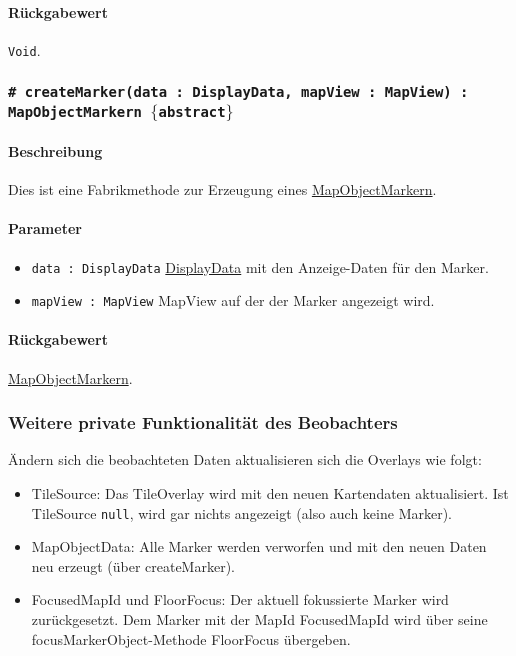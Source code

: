 \paragraph*{Rückgabewert}
\texttt{Void}.

\subsubsection*{\texttt{\# createMarker(data : DisplayData, mapView : MapView) : MapObjectMarkern $\lbrace$abstract$\rbrace$}}%
\paragraph*{Beschreibung}
Dies ist eine Fabrikmethode zur Erzeugung eines \hyperref[App_Map_View_MapObjectMarker]{MapObjectMarkern}.
\paragraph*{Parameter}
\begin{itemize}
    \item \texttt{data : DisplayData} \hyperref[App_Map_Util_DisplayData]{DisplayData} mit den Anzeige-Daten für den Marker.
    \item \texttt{mapView : MapView} MapView auf der der Marker angezeigt wird.
\end{itemize}
\paragraph*{Rückgabewert}
\hyperref[App_Map_View_MapObjectMarker]{MapObjectMarkern}.


\subsubsection*{Weitere private Funktionalität des Beobachters}
Ändern sich die beobachteten Daten aktualisieren sich die Overlays wie folgt:
\begin{itemize}
    \item TileSource: Das TileOverlay wird mit den neuen Kartendaten aktualisiert.
    Ist TileSource \texttt{null}, wird gar nichts angezeigt (also auch keine Marker).
    \item MapObjectData: Alle Marker werden verworfen und mit den neuen Daten neu erzeugt (über createMarker).
    \item FocusedMapId und FloorFocus: Der aktuell fokussierte Marker wird zurückgesetzt.
    Dem Marker mit der MapId FocusedMapId wird über seine focusMarkerObject-Methode FloorFocus übergeben.
\end{itemize}

